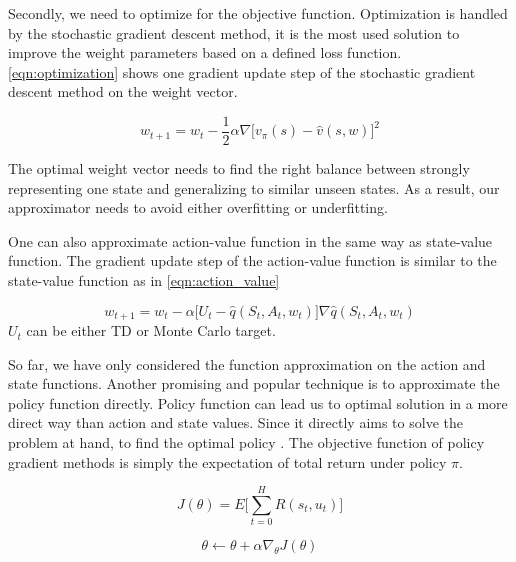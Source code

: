 Secondly, we need to optimize for the objective function. Optimization is handled by the stochastic gradient descent method, it is the most used solution to improve the weight parameters based on a defined loss function. \ref{eqn:optimization} shows one gradient update step of the stochastic gradient descent method on the weight vector.  

\begin{equation}
    \label{eqn:optimization}
    w_{t+1} = w_t - \frac{1}{2}\alpha\nabla\Big[v_{\pi}(s) - \hat{v}(s,w)\Big]^2
\end{equation}

The optimal weight vector needs to find the right balance between strongly representing one state and generalizing to similar unseen states. As a result, our approximator needs to avoid either overfitting or underfitting.


One can also approximate action-value function in the same way as state-value function. The gradient update step of the action-value function is similar to the state-value function as in \ref{eqn:action_value}

\begin{equation}
    \label{eqn:action_value}
    w_{t+1} = w_t -\alpha\Big[U_t - \hat{q}(S_t,A_t, w_t)\Big]\nabla\hat{q}(S_t, A_t, w_t)
\end{equation}
\(U_t\) can be either TD or Monte Carlo target.


So far, we have only considered the function approximation on the action and state functions.  Another promising and popular technique is to approximate the policy function directly. Policy function can lead us to optimal solution in a more direct way than action and state values. Since it directly aims to solve the problem at hand, to find the optimal policy \cite{SpinningUp2018}.
The objective function of policy gradient methods is simply the expectation of total return under policy \(\pi\).

\begin{equation}
    \label{eqn:policy-objective}
    J(\theta) = E\Big[\sum\limits_{t=0}^H R(s_t, u_t)\Big]
\end{equation}


\begin{equation}
    \theta \leftarrow \theta + \alpha\nabla_{\theta}J(\theta) 
\end{equation}